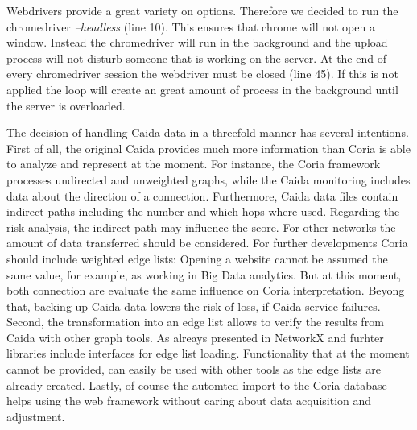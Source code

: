 \documentclass[conference, 11pt]{IEEEtran}
\begin{document}
Webdrivers provide a great variety on options. Therefore we decided to run the chromedriver \textit{--headless} (line 10). This ensures that chrome will not open a window. Instead the chromedriver will run in the background and the upload process will not disturb someone that is working on the server. At the end of every chromedriver session the webdriver must be closed (line 45). If this is not applied the loop will create an great amount of process in the background until the server is overloaded.
\linebreak

The decision of handling Caida data in a threefold manner has several intentions. First of all, the original Caida provides much more information than Coria is able to analyze and represent at the moment. For instance, the Coria framework processes undirected and unweighted graphs, while the Caida monitoring includes data about the direction of a connection. Furthermore, Caida data files contain indirect paths including the number and which hops where used. Regarding the risk analysis, the indirect path may influence the score. For other networks the amount of data transferred should be considered. For further developments Coria should include weighted edge lists: Opening a website cannot be assumed the same value, for example, as working in Big Data analytics. But at this moment, both connection are evaluate the same influence on Coria interpretation. Beyong that, backing up Caida data lowers the risk of loss, if Caida service failures.
Second, the transformation into an edge list allows to verify the results from Caida with other graph tools. As alreays presented in \cite{Coria3} NetworkX and furhter libraries include interfaces for edge list loading. Functionality that at the moment cannot be provided, can easily be used with other tools as the edge lists are already created.
Lastly, of course the automted import to the Coria database helps using the web framework without caring about data acquisition and adjustment. 
\end{document}
